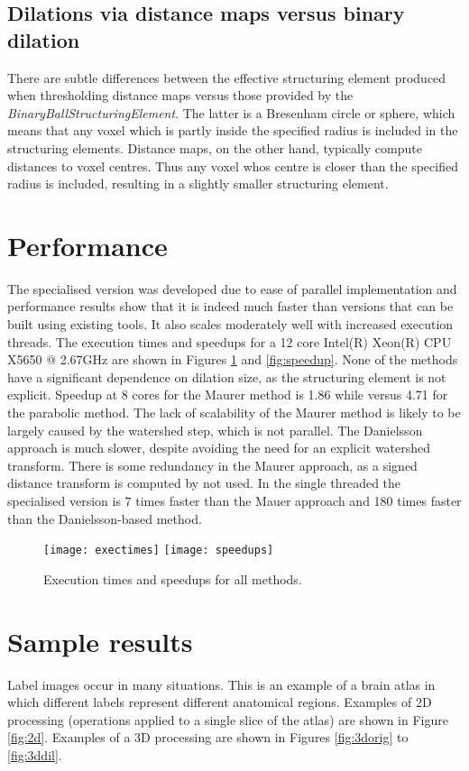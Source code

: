 \documentclass{InsightArticle}
\begin{document}
\subsection{Dilations via distance maps versus binary dilation}
There are subtle differences between the effective structuring element
produced when thresholding distance maps versus those provided by the
{\em BinaryBallStructuringElement}. The latter is a Bresenham circle
or sphere, which means that any voxel which is partly inside the
specified radius is included in the structuring elements. Distance
maps, on the other hand, typically compute distances to voxel
centres. Thus any voxel whos centre is closer than the specified
radius is included, resulting in a slightly smaller structuring
element.
\section{Performance}
The specialised version was developed due to ease of parallel
implementation and performance results show that it is indeed much
faster than versions that can be built using existing tools. It also
scales moderately well with increased execution threads. The execution
times and speedups for a 12 core Intel(R) Xeon(R) CPU X5650 @ 2.67GHz
are shown in Figures \ref{fig:exec} and \ref{fig:speedup}. None of the
methods have a significant dependence on dilation size, as the
structuring element is not explicit. Speedup at 8 cores for the Maurer
method is 1.86 while versus 4.71 for the parabolic method. The lack of
scalability of the Maurer method is likely to be largely caused by the
watershed step, which is not parallel. The Danielsson approach is much
slower, despite avoiding the need for an explicit watershed
transform. There is some redundancy in the Maurer approach, as a
signed distance transform is computed by not used. In the single
threaded the specialised version is 7 times faster than the Mauer
approach and 180 times faster than the Danielsson-based method.

\begin{figure}[htbp]
\centering
\texttt{[image: exectimes]}
\texttt{[image: speedups]}
\caption{Execution times and speedups for all methods.\label{fig:exec}}
\end{figure}


\section{Sample results}
Label images occur in many situations. This is an example of a brain
atlas in which different labels represent different anatomical
regions. Examples of 2D processing (operations applied to a single
slice of the atlas) are shown in Figure \ref{fig:2d}. Examples of a 3D
processing are shown in Figures \ref{fig:3dorig} to \ref{fig:3ddil}.
\end{document}
